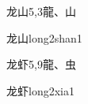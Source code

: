 \begin{Entry}{龙山}{5,3}{⿓、⼭}
  \begin{Phonetics}{龙山}{long2shan1}
  \end{Phonetics}
\end{Entry}

\begin{Entry}{龙虾}{5,9}{⿓、⾍}
  \begin{Phonetics}{龙虾}{long2xia1}
  \end{Phonetics}
\end{Entry}


